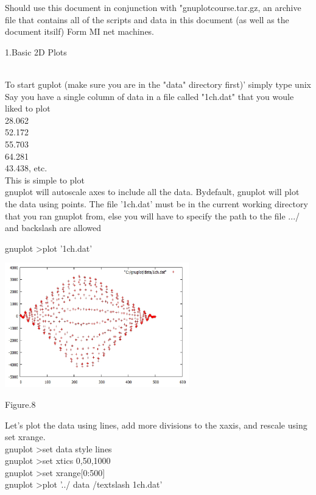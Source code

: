 \documentclass[onecolumn,journal] {IEEEtran}
\begin{document}
\begin{flushleft}
Should use this document in conjunction with "gnuplotcourse.tar.gz, an archive file that contains all of the scripts and data in this document (as well as the document itsilf) Form MI net machines.
\newline
\newline
\begin{Large}
1.Basic 2D Plots 
\end{Large} \\
To start guplot (make sure you are in the "data" directory first)'  simply type unix%
Say you have a single column of data in a file called "1ch.dat" that you woule liked to plot\\
28.062\\
52.172\\
55.703\\
64.281\\
43.438, etc.\\
This is simple to plot\\
gnuplot will autoscale axes to include all the data. Bydefault, gnuplot will plot the data using points. The file '1ch.dat' must be in the current working directory that you ran gnuplot from, else you will have to specify the path to the file .../ and backslash are allowed

  gnuplot \textgreater   plot  '1ch.dat' \\ %

 \end{flushleft}
 \center
\includegraphics[width=8cm]{1ch.jpg}
\begin{center}
\end{center} 
\begin{center}
Figure.8
\end{center}
\begin{flushleft}
Let's plot the data  using lines, add more divisions to the xaxis, and rescale using set xrange.\\
 gnuplot \textgreater  set data style lines\\
 gnuplot \textgreater  set xtics 0,50,1000\\
gnuplot \textgreater  set  xrange[0:500]\\
gnuplot \textgreater  plot '../ data /textslash 1ch.dat' \\
\end{flushleft}
 
\end{document}
